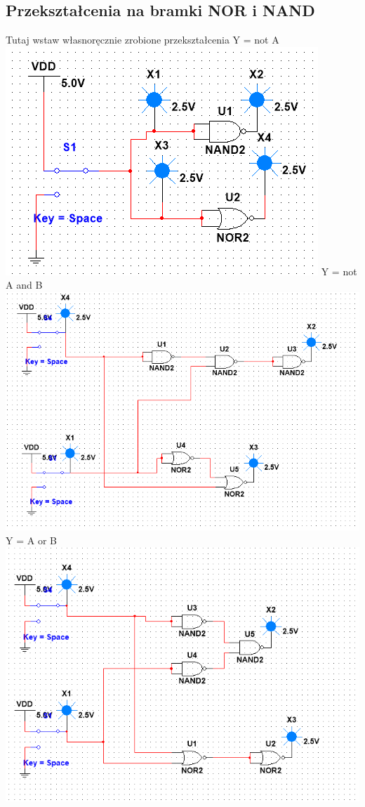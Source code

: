 \documentclass[12pt,a4paper]{article}
\begin{document}
\subsection{Przekształcenia na bramki NOR i NAND}
Tutaj wstaw własnoręcznie zrobione przekształcenia
\newpage
Y = not A\\
\includegraphics[width=\textwidth]{1e1}
Y = not A and B\\
\includegraphics[width=\textwidth]{1e2}
\newpage
Y = A or B\\
\includegraphics[width=\textwidth]{1e3}
\end{document}
